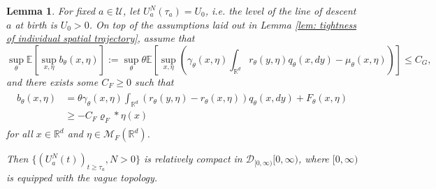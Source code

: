\documentclass[12pt]{article}
\newtheorem{lemma}[theorem]{Lemma}
\newcommand{\IR}{\mathbb R}
\begin{document}
\begin{lemma} \label{lem:tightness of levels} For fixed $a\in \mathcal{U}$, let $U^N_{a}(\tau_a)=U_0$, i.e. the level of the line of descent $a$ at birth is $U_0>0$.
On top of the assumptions laid out in Lemma \ref{lem: tightness of individual spatial trajectory}, assume that 
$$
    \sup_{\theta}\mathbb{E}\left[ \sup_{x, \eta} b_\theta(x, \eta) \right]
    :=
    \sup_{\theta}
    \theta 
    \mathbb{E}\left[ \sup_{x, \eta} \left(
    \gamma_\theta(x,\eta) \int_{\IR^d} r_\theta(y, \eta) q_\theta(x, dy)
    -
    \mu_\theta(x,\eta)
    \right)\right] 
    \leq C_G,
$$
and there exists some $C_F \geq 0$ such that
\begin{align} 
\begin{split}
b_{\theta}(x, \eta)
&=
    \theta \gamma_{\theta}(x, \eta) \int_{\IR^d} \left( r_{\theta}(y, \eta) - r_{\theta}(x, \eta) \right) q_{\theta}(x, dy)
    + F_{\theta}(x, \eta) \\
& \geq - C_F \varrho_F*\eta(x)
\end{split}
\end{align}
for all $x \in \IR^d$ and  $\eta \in \mathcal{M}_{F}(\IR^d)$.

Then
$\{(U^{N}_{a}(t))_{t \geq \tau_a}, N >0\}$ is relatively compact in 
$\mathcal{D}_{[0,\infty)}[0,\infty )$, where $[0,\infty)$ is equipped with the vague topology.
\end{lemma}
\end{document}

